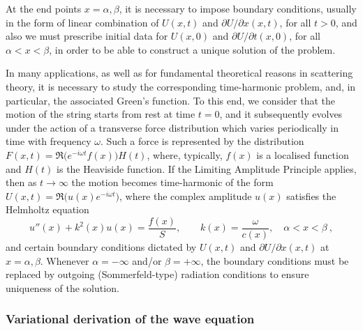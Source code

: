 \documentclass[twoside,11pt]{article}
\begin{document}
{At the end points $x=\alpha,\beta$,  it is necessary to impose boundary conditions, usually in the form of linear combination of $U(x,t)$ and $\partial U/\partial x (x,t)$,  for all $t>0$, and also we must prescribe initial data for $U(x,0)$ and $\partial U/\partial t(x,0)$, for all $\alpha < x< \beta$, in order   {to be able to construct} a unique solution of the problem.

In many applications, as well as for fundamental theoretical reasons in scattering theory, it is necessary to study the corresponding time-harmonic problem, and, in particular, the associated Green's function. To this end, we consider that the motion of the string starts from rest at time $t = 0$,  and it subsequently evolves  {under the action} of a transverse force distribution which varies periodically in time with frequency $\omega$. Such a force is represented by the distribution $F(x,t)=\Re\bigl(e^{-i\omega t} f(x)\bigr) H(t)$, where, typically, $f(x)$ is a localised function and $H(t)$ is the  {Heaviside function}.  {If the Limiting Amplitude Principle applies, then as $t \to \infty$ the motion becomes time-harmonic of the form} $U(x,t) = \Re\bigl(u(x) e^{-i\omega t}\bigr)$, where the complex amplitude $u(x)$ satisfies the Helmholtz equation
\begin{equation}\label{eq:helm-nh}
u''(x) + k^2(x) u(x) = \frac{f(x)}{S}, \qquad  k(x) =\frac{\omega}{c(x)},   \quad \alpha < x< \beta \ ,
\end{equation}
and certain boundary conditions dictated by $U(x,t)$ and $\partial U/\partial x (x,t)$ at $x=\alpha,\beta$. Whenever $\alpha=-\infty$ and/or $\beta=+\infty$, the boundary conditions must be replaced by  {outgoing (Sommerfeld-type) radiation conditions} to ensure uniqueness of the solution.

\subsubsection*{Variational derivation of the wave equation}

}
\end{document}
